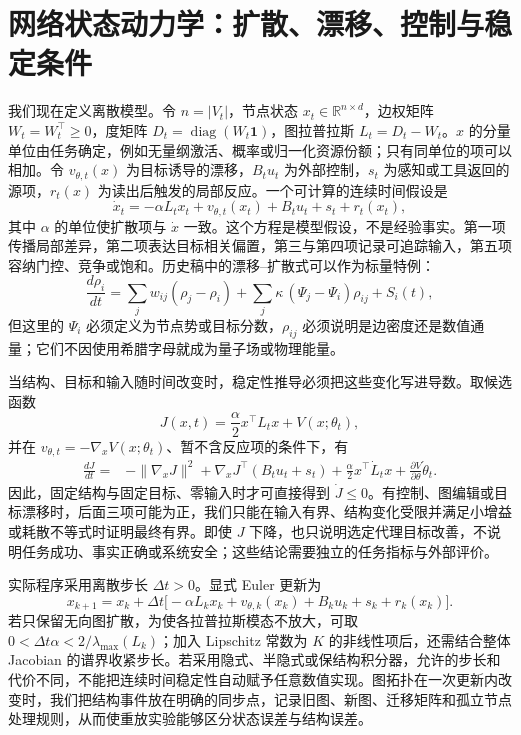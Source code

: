 \section{网络状态动力学：扩散、漂移、控制与稳定条件}

我们现在定义离散模型。令 $n=|V_t|$，节点状态 $x_t\in\mathbb R^{n\times d}$，边权矩阵 $W_t=W_t^\top\ge0$，度矩阵 $D_t=\operatorname{diag}(W_t\mathbf1)$，图拉普拉斯 $L_t=D_t-W_t$。$x$ 的分量单位由任务确定，例如无量纲激活、概率或归一化资源份额；只有同单位的项可以相加。令 $v_{\theta,t}(x)$ 为目标诱导的漂移，$B_tu_t$ 为外部控制，$s_t$ 为感知或工具返回的源项，$r_t(x)$ 为读出后触发的局部反应。一个可计算的连续时间假设是
\begin{equation}
\dot x_t=-\alpha L_t x_t+v_{\theta,t}(x_t)+B_tu_t+s_t+r_t(x_t),
\end{equation}
其中 $\alpha$ 的单位使扩散项与 $\dot x$ 一致。这个方程是模型假设，不是经验事实。第一项传播局部差异，第二项表达目标相关偏置，第三与第四项记录可追踪输入，第五项容纳门控、竞争或饱和。历史稿中的漂移--扩散式可以作为标量特例：
\begin{equation}
\frac{d\rho_i}{dt}=\sum_j w_{ij}(\rho_j-\rho_i)+\sum_j\kappa\,(\Psi_j-\Psi_i)\rho_{ij}+S_i(t),
\end{equation}
但这里的 $\Psi_i$ 必须定义为节点势或目标分数，$\rho_{ij}$ 必须说明是边密度还是数值通量；它们不因使用希腊字母就成为量子场或物理能量。

当结构、目标和输入随时间改变时，稳定性推导必须把这些变化写进导数。取候选函数
\begin{equation}
J(x,t)=\frac{\alpha}{2}x^\top L_t x+V(x;\theta_t),
\end{equation}
并在 $v_{\theta,t}=-\nabla_xV(x;\theta_t)$、暂不含反应项的条件下，有
\begin{align}
\frac{dJ}{dt}={}&-\|\nabla_xJ\|^2+\nabla_xJ^\top(B_tu_t+s_t)
+\frac{\alpha}{2}x^\top\dot L_t x
+\frac{\partial V}{\partial\theta}\dot\theta_t.
\end{align}
因此，固定结构与固定目标、零输入时才可直接得到 $\dot J\le0$。有控制、图编辑或目标漂移时，后面三项可能为正，我们只能在输入有界、结构变化受限并满足小增益或耗散不等式时证明最终有界。即使 $J$ 下降，也只说明选定代理目标改善，不说明任务成功、事实正确或系统安全；这些结论需要独立的任务指标与外部评价。

实际程序采用离散步长 $\Delta t>0$。显式 Euler 更新为
\begin{equation}
x_{k+1}=x_k+\Delta t\big[-\alpha L_kx_k+v_{\theta,k}(x_k)+B_ku_k+s_k+r_k(x_k)\big].
\end{equation}
若只保留无向图扩散，为使各拉普拉斯模态不放大，可取 $0<\Delta t\alpha<2/\lambda_{\max}(L_k)$；加入 Lipschitz 常数为 $K$ 的非线性项后，还需结合整体 Jacobian 的谱界收紧步长。若采用隐式、半隐式或保结构积分器，允许的步长和代价不同，不能把连续时间稳定性自动赋予任意数值实现。图拓扑在一次更新内改变时，我们把结构事件放在明确的同步点，记录旧图、新图、迁移矩阵和孤立节点处理规则，从而使重放实验能够区分状态误差与结构误差。

